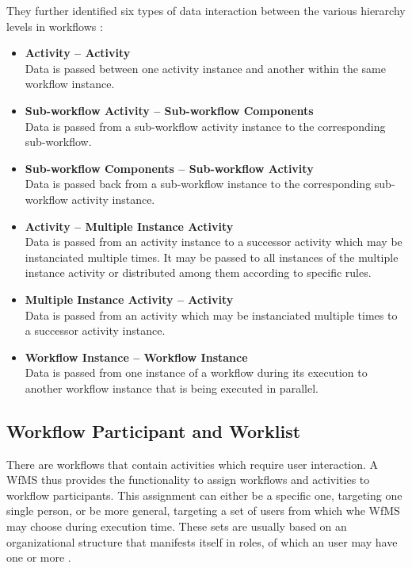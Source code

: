     They further identified six types of data interaction between the various hierarchy levels in workflows \cite[p.~16-24]{Russell2005Workflow}:
    \begin{itemize}
      \item \textbf{Activity -- Activity} \hfill \\
        Data is passed between one activity instance and another within the same workflow instance.
      \item \textbf{Sub-workflow Activity -- Sub-workflow Components} \hfill \\
        Data is passed from a sub-workflow activity instance to the corresponding sub-workflow.
      \item \textbf{Sub-workflow Components -- Sub-workflow Activity} \hfill \\
        Data is passed back from a sub-workflow instance to the corresponding sub-workflow activity instance.
      \item \textbf{Activity -- Multiple Instance Activity} \hfill \\
        Data is passed from an activity instance to a successor activity which may be instanciated multiple times. It may be passed to all instances of the multiple instance activity or distributed among them according to specific rules.
      \item \textbf{Multiple Instance Activity -- Activity} \hfill \\
        Data is passed from an activity which may be instanciated multiple times to a successor activity instance.
      \item \textbf{Workflow Instance -- Workflow Instance} \hfill \\
        Data is passed from one instance of a workflow during its execution to another workflow instance that is being executed in parallel.
    \end{itemize}

  \subsection{Workflow Participant and Worklist} %
  \label{sub:workflow_participants}
    There are workflows that contain activities which require user interaction. A \ac{WfMS} thus provides the functionality to assign workflows and activities to workflow participants. This assignment can either be a specific one, targeting one single person, or be more general, targeting a set of users from which whe \ac{WfMS} may choose during execution time. These sets are usually based on an organizational structure that manifests itself in roles, of which an user may have one or more \cite{Hollingsworth1995Wfmc,Casati1999Specification}.

